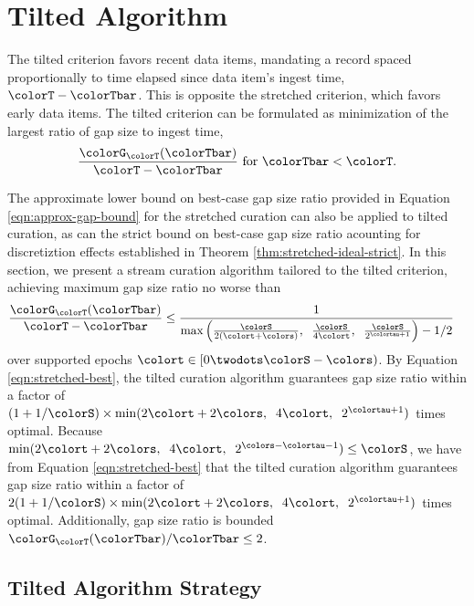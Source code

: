 \section{Tilted Algorithm} \label{sec:tilted}

The tilted criterion favors recent data items, mandating a record spaced proportionally to time elapsed since data item's ingest time, $\colorT - \colorTbar$.
This is opposite the stretched criterion, which favors early data items.
The tilted criterion can be formulated as minimization of the largest ratio of gap size to ingest time,
\begin{align*}
\frac{\colorG_{\colorT}(\colorTbar)}{\colorT - \colorTbar} \text{ for } \colorTbar < \colorT.
\end{align*}

The approximate lower bound on best-case gap size ratio provided in Equation \ref{eqn:approx-gap-bound} for the stretched curation can also be applied to tilted curation, as can the strict bound on best-case gap size ratio acounting for discretiztion effects established in Theorem \ref{thm:stretched-ideal-strict}.
In this section, we present a stream curation algorithm tailored to the tilted criterion, achieving maximum gap size ratio no worse than
\begin{align*}
  \frac{\colorG_{\colorT}(\colorTbar)}{\colorT - \colorTbar}
  &\leq
  \frac{
    1
  }{
    \max\Big(
      \frac{\colorS}{2(\colort + \colors)},\;\;
      \frac{\colorS}{4\colort},\;\;
      \frac{\colorS}{2^{\colortau + 1}}
    \Big)
    - 1/2
  }
\end{align*}
over supported epochs $\colort \in [0\twodots\colorS - \colors)$.
By Equation \ref{eqn:stretched-best}, the tilted curation algorithm guarantees gap size ratio within a factor of $(1 + 1/\colorS)\times\min(2\colort + 2\colors, \;\; 4\colort, \;\; 2^{\colortau + 1})$ times optimal.
Because $\min(2\colort + 2\colors,\;\; 4\colort,\;\; 2^{\colors - \colortau - 1}) \leq \colorS$, we have from Equation \ref{eqn:stretched-best} that the tilted curation algorithm guarantees gap size ratio within a factor of $2(1 + 1/\colorS)\times\min(2\colort + 2\colors, \;\; 4\colort, \;\; 2^{\colortau + 1})$ times optimal.
Additionally, gap size ratio is bounded ${\colorG_{\colorT}(\colorTbar)}/{\colorTbar} \leq 2$.


\subsection{Tilted Algorithm Strategy}
\label{sec:tilted-strategy}

